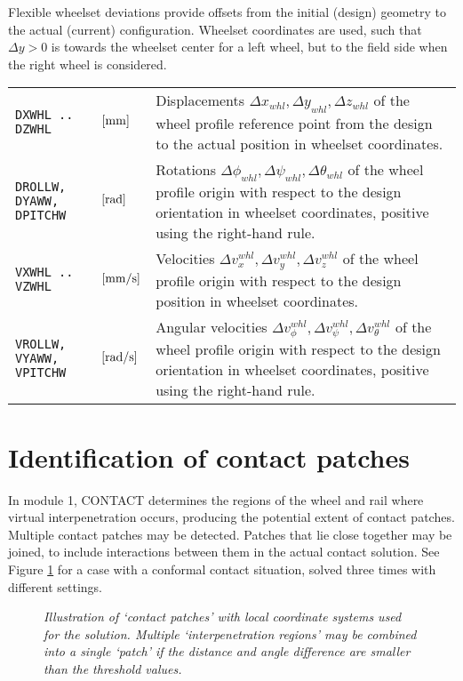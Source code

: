 \documentclass[12pt]{report}
\newenvironment{inputvars}{\vspace{0.4\baselineskip}%

\begin{tabular}{>{\raggedright}p{22mm}p{19mm}p{113mm}}}{
\end{tabular}

}
\newcommand{\inpvar}[3]{{\small\tt #1} & $#2$ & #3 \\[1ex]}
\begin{document}
Flexible wheelset deviations provide offsets from the initial (design)
geometry to the actual (current) configuration. Wheelset coordinates are
used, such that $\Delta y>0$ is towards the wheelset center for a left
wheel, but to the field side when the right wheel is considered.
\begin{inputvars}
\inpvar{DXWHL .. \mbox{\hspace{4mm}DZWHL}}{\bunit{mm}}{Displacements 
        $\Delta x_{whl}, \Delta y_{whl}, \Delta z_{whl}$ of the wheel
        profile reference point from the design to the actual position
        in wheelset coordinates.}
\inpvar{DROLLW, \mbox{\hspace{4mm}DYAWW}, \mbox{\hspace{4mm}DPITCHW}}{
        \bunit{rad}}{Rotations $\Delta\phi_{whl}, \Delta\psi_{whl}, 
        \Delta\theta_{whl}$ of the wheel profile origin with respect to
        the design orientation in wheelset coordinates, positive using
        the right-hand rule.}
\inpvar{VXWHL .. \mbox{\hspace{4mm}VZWHL}}{\bunit{mm/s}}{Velocities 
        $\Delta v_x^{whl}, \Delta v_y^{whl}, \Delta v_z^{whl}$ of the
        wheel profile origin with respect to the design position in
        wheelset coordinates.}
\inpvar{VROLLW, \mbox{\hspace{4mm}VYAWW}, \mbox{\hspace{4mm}VPITCHW}}{
        \bunit{rad/s}}{Angular velocities $\Delta v_\phi^{whl}, 
        \Delta v_\psi^{whl}, \Delta v_\theta^{whl}$ of the wheel profile
        origin with respect to the design orientation in wheelset
        coordinates, positive using the right-hand rule.}
\end{inputvars}
 
\section{Identification of contact patches}
\label{sec:cpatches}

In module 1, CONTACT determines the regions of the wheel and rail where
virtual interpenetration occurs, producing the potential extent of 
contact patches. Multiple contact patches may be detected. Patches that lie
close together may be joined, to include interactions between them in the
actual contact solution. See Figure \ref{fig:site_b_cpatch} for a case with
a conformal contact situation, solved three times with different settings.

\begin{figure}[bt]
\centering
{}
\caption{\em Illustration of `contact patches' with local coordinate
        systems used for the solution. Multiple `interpenetration regions'
        may be combined into a single `patch' if the distance and angle
        difference are smaller than the threshold values.}
\label{fig:site_b_cpatch}
\end{figure}
\end{document}
